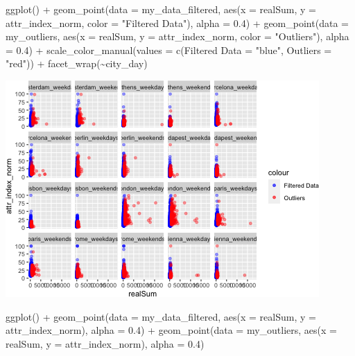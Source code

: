 \documentclass[
]{article}
\newenvironment{Shaded}{\begin{snugshade}}{\end{snugshade}}
\newcommand{\AttributeTok}[1]{\textcolor[rgb]{0.77,0.63,0.00}{#1}}
\newcommand{\FloatTok}[1]{\textcolor[rgb]{0.00,0.00,0.81}{#1}}
\newcommand{\FunctionTok}[1]{\textcolor[rgb]{0.00,0.00,0.00}{#1}}
\newcommand{\NormalTok}[1]{#1}
\newcommand{\OtherTok}[1]{\textcolor[rgb]{0.56,0.35,0.01}{#1}}
\newcommand{\SpecialCharTok}[1]{\textcolor[rgb]{0.00,0.00,0.00}{#1}}
\newcommand{\StringTok}[1]{\textcolor[rgb]{0.31,0.60,0.02}{#1}}
\begin{document}
\begin{Shaded}
\begin{Highlighting}[]
\FunctionTok{ggplot}\NormalTok{() }\SpecialCharTok{+} \FunctionTok{geom\_point}\NormalTok{(}\AttributeTok{data =}\NormalTok{ my\_data\_filtered, }\FunctionTok{aes}\NormalTok{(}\AttributeTok{x =}\NormalTok{ realSum,}
    \AttributeTok{y =}\NormalTok{ attr\_index\_norm, }\AttributeTok{color =} \StringTok{"Filtered Data"}\NormalTok{), }\AttributeTok{alpha =} \FloatTok{0.4}\NormalTok{) }\SpecialCharTok{+}
    \FunctionTok{geom\_point}\NormalTok{(}\AttributeTok{data =}\NormalTok{ my\_outliers, }\FunctionTok{aes}\NormalTok{(}\AttributeTok{x =}\NormalTok{ realSum, }\AttributeTok{y =}\NormalTok{ attr\_index\_norm,}
        \AttributeTok{color =} \StringTok{"Outliers"}\NormalTok{), }\AttributeTok{alpha =} \FloatTok{0.4}\NormalTok{) }\SpecialCharTok{+} \FunctionTok{scale\_color\_manual}\NormalTok{(}\AttributeTok{values =} \FunctionTok{c}\NormalTok{(}\StringTok{\textasciigrave{}}\AttributeTok{Filtered Data}\StringTok{\textasciigrave{}} \OtherTok{=} \StringTok{"blue"}\NormalTok{,}
    \AttributeTok{Outliers =} \StringTok{"red"}\NormalTok{)) }\SpecialCharTok{+} \FunctionTok{facet\_wrap}\NormalTok{(}\SpecialCharTok{\textasciitilde{}}\NormalTok{city\_day)}
\end{Highlighting}
\end{Shaded}

\includegraphics{Project_files/figure-latex/unnamed-chunk-16-2.png}

\begin{Shaded}
\begin{Highlighting}[]
\FunctionTok{ggplot}\NormalTok{() }\SpecialCharTok{+} \FunctionTok{geom\_point}\NormalTok{(}\AttributeTok{data =}\NormalTok{ my\_data\_filtered, }\FunctionTok{aes}\NormalTok{(}\AttributeTok{x =}\NormalTok{ realSum,}
    \AttributeTok{y =}\NormalTok{ attr\_index\_norm), }\AttributeTok{alpha =} \FloatTok{0.4}\NormalTok{) }\SpecialCharTok{+} \FunctionTok{geom\_point}\NormalTok{(}\AttributeTok{data =}\NormalTok{ my\_outliers,}
    \FunctionTok{aes}\NormalTok{(}\AttributeTok{x =}\NormalTok{ realSum, }\AttributeTok{y =}\NormalTok{ attr\_index\_norm), }\AttributeTok{alpha =} \FloatTok{0.4}\NormalTok{)}
\end{Highlighting}
\end{Shaded}
\end{document}
